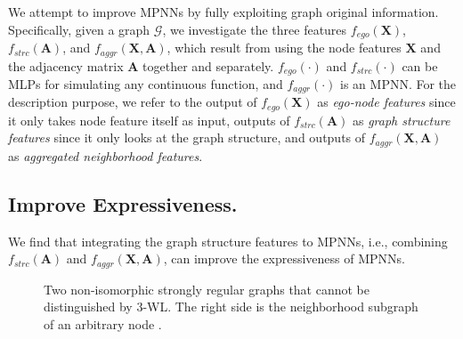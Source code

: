 \documentclass{article}
\theoremstyle{plain}
\begin{document}
We attempt to improve MPNNs by fully exploiting graph original information. 
Specifically, given a graph $\mathcal{G}$, we investigate the three features $f_{ego}(\mathbf{X})$, $f_{strc}(\mathbf{A})$, and $f_{aggr}(\mathbf{X},\mathbf{A})$, which result from using the node features $\mathbf{X}$ and the adjacency matrix $\mathbf{A}$ together and separately. 
$f_{ego}(\cdot)$ and $f_{strc}(\cdot)$ can be MLPs for simulating any continuous function, and $f_{aggr}(\cdot)$ is an MPNN.
For the description purpose, we refer to the output of $f_{ego}(\mathbf{X})$ as \textit{ego-node features} since it only takes node feature itself as input, outputs of $f_{strc}(\mathbf{A})$ as \textit{graph structure features} since it only looks at the graph structure, and outputs of $f_{aggr}(\mathbf{X},\mathbf{A})$ as \textit{aggregated neighborhood features}. 


\subsection{Improve Expressiveness.}
We find that integrating the graph structure features to MPNNs, i.e., combining $f_{strc}(\mathbf{A})$ and $f_{aggr}(\mathbf{X},\mathbf{A})$, can improve the expressiveness of MPNNs. 


\begin{figure}[t]
\centering
{}
\caption{Two non-isomorphic strongly regular graphs that cannot be distinguished by 3-WL. The right side is the neighborhood subgraph of an arbitrary node .}
\label{fig:srg}
\end{figure}
\end{document}
